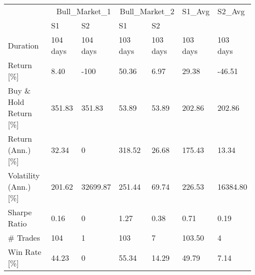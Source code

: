 \begin{tabular}{lllllll}
\toprule
 & \multicolumn{2}{r}{Bull_Market_1} & \multicolumn{2}{r}{Bull_Market_2} & S1_Avg & S2_Avg \\
 & S1 & S2 & S1 & S2 &  &  \\
\midrule
Duration & 104 days   & 104 days   & 103 days   & 103 days   & 103 days   & 103 days   \\
Return  [\%] & 8.40 & -100  & 50.36 & 6.97 & 29.38 & -46.51 \\
Buy \& Hold Return  [\%] & 351.83 & 351.83 & 53.89 & 53.89 & 202.86 & 202.86 \\
Return (Ann.)  [\%] & 32.34 & 0  & 318.52 & 26.68 & 175.43 & 13.34 \\
Volatility (Ann.)  [\%] & 201.62 & 32699.87 & 251.44 & 69.74 & 226.53 & 16384.80 \\
Sharpe Ratio & 0.16 & 0  & 1.27 & 0.38 & 0.71 & 0.19 \\
\# Trades & 104 & 1 & 103 & 7 & 103.50 & 4  \\
Win Rate  [\%] & 44.23 & 0  & 55.34 & 14.29 & 49.79 & 7.14 \\
\bottomrule
\end{tabular}

